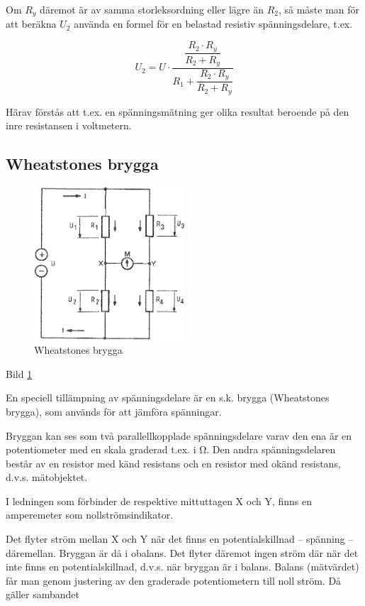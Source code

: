 Om \(R_y\) däremot är av samma storleksordning eller lägre än \(R_2\), så måste
man för att beräkna \(U_2\) använda en formel för en belastad resistiv
spänningsdelare, t.ex.

\[
U_2 = U \cdot \dfrac{ \dfrac{R_2 \cdot R_y}{R_2 + R_y} }{ R_1 + \dfrac{R_2 \cdot R_y}{R_2 + R_y} }
\]

Härav förstås att t.ex. en spänningsmätning ger olika resultat beroende på den
inre resistansen i voltmetern.

\subsection{Wheatstones brygga}

\begin{figure}
\includegraphics[width=0.5\textwidth]{images/cropped_pdfs/bild_2_3-04.pdf}
\caption{Wheatstones brygga}
\label{fig:BildII3-04}
\end{figure}

Bild \ref{fig:BildII3-04}

En speciell tillämpning av spänningsdelare är en s.k. brygga (Wheatstones
brygga), som används för att jämföra spänningar.

Bryggan kan ses som två parallellkopplade spänningsdelare varav den ena är en
potentiometer med en skala graderad t.ex. i Ω. Den andra spänningsdelaren består
av en resistor med känd resistans och en resistor med okänd resistans, d.v.s.
mätobjektet.

I ledningen som förbinder de respektive mittuttagen X och Y, finns en
amperemeter som nollströmsindikator.


Det flyter ström mellan X och Y när det finns en potentialskillnad -- spänning
-- däremellan.
Bryggan är då i obalans. Det flyter däremot ingen ström där när det
inte finns en potentialskillnad, d.v.s. när bryggan är i balans. Balans
(mätvärdet) får man genom justering av den graderade potentiometern till noll
ström. Då gäller sambandet

